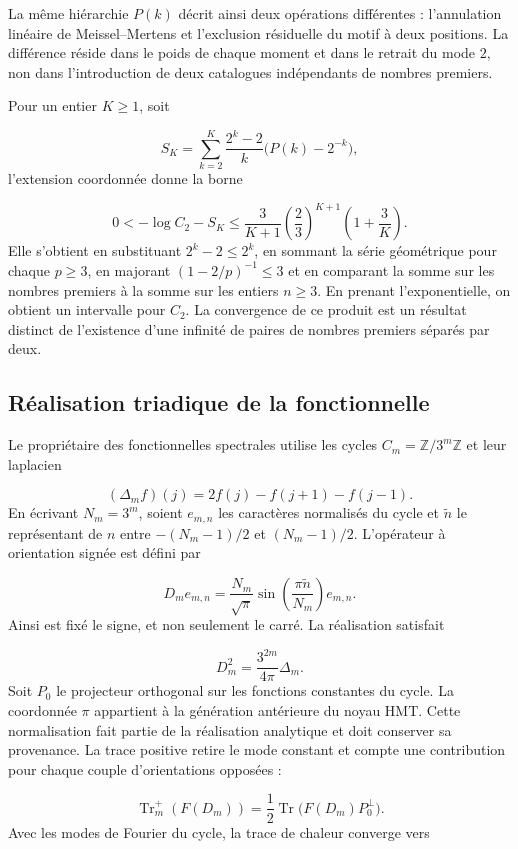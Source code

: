La même hiérarchie $P(k)$ décrit ainsi deux opérations différentes : l’annulation linéaire de Meissel–Mertens et l’exclusion résiduelle du motif à deux positions. La différence réside dans le poids de chaque moment et dans le retrait du mode $2$, non dans l’introduction de deux catalogues indépendants de nombres premiers.

Pour un entier \(K\ge1\), soit

\[
S_K=\sum_{k=2}^K\frac{2^k-2}{k}\bigl(P(k)-2^{-k}\bigr),
\]
l'extension coordonnée donne la borne

\[
0<-\log C_2-S_K
\le\frac3{K+1}\left(\frac23\right)^{K+1}\left(1+\frac3K\right).
\]
Elle s'obtient en substituant $2^k-2\le2^k$, en sommant la série géométrique pour chaque $p\ge3$, en majorant $(1-2/p)^{-1}\le3$ et en comparant la somme sur les nombres premiers à la somme sur les entiers $n\ge3$. En prenant l'exponentielle, on obtient un intervalle pour $C_2$. La convergence de ce produit est un résultat distinct de l'existence d'une infinité de paires de nombres premiers séparés par deux.



\subsection{Réalisation triadique de la fonctionnelle}
Le propriétaire des fonctionnelles spectrales utilise les cycles $C_m=\mathbb Z/3^m\mathbb Z$ et leur laplacien

\[
(\Delta_mf)(j)=2f(j)-f(j+1)-f(j-1).
\]
En écrivant \(N_m=3^m\), soient \(e_{m,n}\) les caractères normalisés du cycle et \(\widetilde n\) le représentant de \(n\) entre \(-(N_m-1)/2\) et \((N_m-1)/2\). L'opérateur à orientation signée est défini par

\[
D_m e_{m,n}=\frac{N_m}{\sqrt{\pi}}
\sin\left(\frac{\pi\widetilde n}{N_m}\right)e_{m,n}.
\]
Ainsi est fixé le signe, et non seulement le carré. La réalisation satisfait

\[
D_m^2=\frac{3^{2m}}{4\pi}\Delta_m.
\]
Soit \(P_0\) le projecteur orthogonal sur les fonctions constantes du cycle. La coordonnée $\pi$ appartient à la génération antérieure du noyau HMT. Cette normalisation fait partie de la réalisation analytique et doit conserver sa provenance. La trace positive retire le mode constant et compte une contribution pour chaque couple d’orientations opposées :

\[
\operatorname{Tr}_m^+(F(D_m))
=\frac12\operatorname{Tr}\bigl(F(D_m)P_0^\perp\bigr).
\]
Avec les modes de Fourier du cycle, la trace de chaleur converge vers

